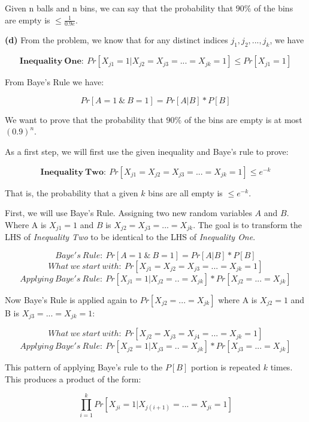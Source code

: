 \documentclass[11pt]{article}
\renewcommand\part[1]{\vspace{.10in}\textbf{(#1)}}
\begin{document}
Given n balls and n bins, we can say that the probability that $90\%$ of the bins are empty is $\leq \frac{1}{0.9e}$.


\part{d} From the problem, we know that for any distinct indices $j_1, j_2,...,j_k$, we have

$$\mathbf{Inequality \ One: \ }Pr[X_{j1} = 1 | X_{j2} = X_{j3} = ... = X_{jk} = 1] \leq Pr[X_{j1} = 1]$$

From Baye's Rule we have:

$$Pr[A = 1 \ \& \ B = 1] = Pr[A | B] * P[B]$$

We want to prove that the probability that $90\%$ of the bins are empty is at most $(0.9)^n$.

As a first step, we will first use the given inequality and Baye's rule to prove:

$$\mathbf{Inequality \ Two: \ } Pr[X_{j1} = X_{j2} = X_{j3} = ... = X_{jk} = 1] \leq e^{-k}$$

That is, the probability that a given $k$ bins are all empty is $\leq e^{-k}$.

First, we will use Baye's Rule. Assigning two new random variables $A$ and $B$. Where A is $X_{j1} = 1$ and $B$ is $X_{j2} = X_{j3} = ... = X_{jk}$. The goal is to transform the LHS of \textit{Inequality Two} to be identical to the LHS of \textit{Inequality One}.

$$Baye's \ Rule: \ Pr[A = 1 \ \& \ B = 1] = Pr[A|B] * P[B]$$
$$What \ we \ start \ with: \ Pr[X_{j1} = X_{j2} = X_{j3} = ... = X_{jk} = 1]$$
$$Applying \ Baye's \ Rule: \ Pr[X_{j1} = 1 | X_{j2} = .. = X_{jk}] * Pr[X_{j2} = ... = X_{jk}]$$

Now Baye's Rule is applied again to $Pr[X_{j2} = ... = X_{jk}]$ where A is $X_{j2} = 1$ and B is $X_{j3} = ... = X_{jk} = 1$:

$$What \ we \ start \ with: \ Pr[X_{j2} = X_{j3} = X_{j4} = ... = X_{jk} = 1]$$
$$Applying \ Baye's \ Rule: \ Pr[X_{j2} = 1 | X_{j3} = .. = X_{jk}] * Pr[X_{j3} = ... = X_{jk}]$$

This pattern of applying Baye's rule to the $P[B]$ portion is repeated $k$ times. This produces a product of the form:

$$\prod_{i = 1}^k Pr[X_{ji} = 1 | X_{j(i + 1)} = ... = X_{ji} = 1]$$
\end{document}

